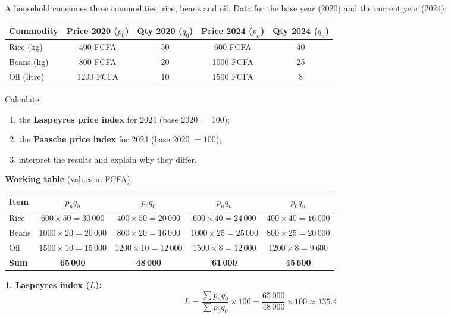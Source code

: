 \documentclass[11pt]{article}
\begin{document}
\begin{exoresolu}
A household consumes three commodities: rice, beans and oil. Data for the base year (2020) and the current year (2024):

\begin{center}
\begin{tabular}{|l|c|c|c|c|}\hline
\rowcolor{popblueL}
\textbf{Commodity} & \textbf{Price 2020 ($p_0$)} & \textbf{Qty 2020 ($q_0$)} & \textbf{Price 2024 ($p_n$)} & \textbf{Qty 2024 ($q_n$)} \\ \hline
Rice (kg) & 400 FCFA & 50 & 600 FCFA & 40 \\ \hline
Beans (kg) & 800 FCFA & 20 & 1000 FCFA & 25 \\ \hline
Oil (litre) & 1200 FCFA & 10 & 1500 FCFA & 8 \\ \hline
\end{tabular}
\end{center}

Calculate:
\begin{enumerate}
    \item the \textbf{Laspeyres price index} for 2024 (base 2020 $= 100$);
    \item the \textbf{Paasche price index} for 2024 (base 2020 $= 100$);
    \item interpret the results and explain why they differ.
\end{enumerate}
\tcblower
\textbf{Working table} (values in FCFA):

\begin{center}
\begin{tabular}{|l|c|c|c|c|}\hline
\rowcolor{popblueL}
Item & $p_n q_0$ & $p_0 q_0$ & $p_n q_n$ & $p_0 q_n$ \\ \hline
Rice & $600\times50=30\,000$ & $400\times50=20\,000$ & $600\times40=24\,000$ & $400\times40=16\,000$ \\ \hline
Beans & $1000\times20=20\,000$ & $800\times20=16\,000$ & $1000\times25=25\,000$ & $800\times25=20\,000$ \\ \hline
Oil & $1500\times10=15\,000$ & $1200\times10=12\,000$ & $1500\times8=12\,000$ & $1200\times8=9\,600$ \\ \hline
\textbf{Sum} & \textbf{65\,000} & \textbf{48\,000} & \textbf{61\,000} & \textbf{45\,600} \\ \hline
\end{tabular}
\end{center}

\textbf{1. Laspeyres index ($L$):}
\[ L = \frac{\sum p_n q_0}{\sum p_0 q_0} \times 100 = \frac{65\,000}{48\,000} \times 100 \approx \mathbf{135.4} \]


\end{exoresolu}
\end{document}
